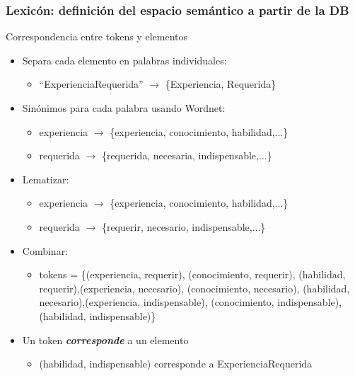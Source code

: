 \fontsize{9.5pt}{7.2}\selectfont
\begin{frame}[<+->]
  \frametitle{Lexicón: definición del espacio semántico a partir de la DB}
  Correspondencia entre tokens y elementos
  \begin{itemize}
    \item Separa cada elemento en palabras individuales:
    \begin{itemize}\fontsize{9.5pt}{7.2}\selectfont
      \item “ExperienciaRequerida” $\rightarrow$ \{Experiencia, Requerida\}
    \end{itemize}
    \item Sinónimos para cada palabra usando Wordnet:
    \begin{itemize}\fontsize{9.5pt}{7.2}\selectfont
      \item experiencia $\rightarrow$ \{experiencia, conocimiento, habilidad,...\}
      \item requerida $\rightarrow$ \{requerida, necesaria, indispensable,...\}
    \end{itemize}
    \item Lematizar:
      \begin{itemize}\fontsize{9.5pt}{7.2}\selectfont
        \item experiencia $\rightarrow$ \{experiencia, conocimiento, habilidad,...\}
        \item requerida $\rightarrow$ \{requerir, necesario, indispensable,...\}
    \end{itemize}
    \item Combinar:
    \begin{itemize}\fontsize{9.5pt}{7.2}\selectfont
        \item tokens = \{(experiencia, requerir), (conocimiento, requerir), (habilidad, requerir),(experiencia, necesario), (conocimiento, necesario), (habilidad, necesario),(experiencia, indispensable), (conocimiento, indispensable), (habilidad, indispensable)\}
    \end{itemize}
    \item Un token \textit{\textbf{corresponde}} a un elemento
    \begin{itemize}\fontsize{9.5pt}{7.2}\selectfont
    \item (habilidad, indispensable) corresponde a ExperienciaRequerida
    \end{itemize}
  \end{itemize}
\end{frame}




